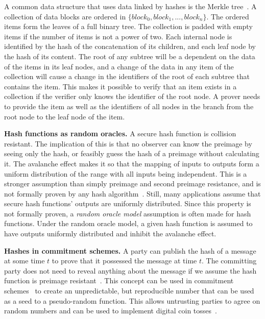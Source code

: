 A common data structure that uses data linked by hashes is the Merkle tree~\cite{merkle_digital_1988}. A collection of data blocks are ordered in $\{block_0, block_1, ..., block_n\}$. The ordered items form the leaves of a full binary tree. The collection is padded with empty items if the number of items is not a power of two. Each internal node is identified by the hash of the concatenation of its children, and each leaf node by the hash of its content. The root of any subtree will be a dependent on the data of the items in its leaf nodes, and a change of the data in any item of the collection will cause a change in the identifiers of the root of each subtree that contains the item. 
This makes it possible to verify that an item exists in a collection if the verifier only knows the identifier of the root node. A prover needs to provide the item as well as the identifiers of all nodes in the branch from the root node to the leaf node of the item. 

\noindent
{\bf Hash functions as random oracles.}
A secure hash function is collision resistant. The implication of this is that no observer can know the preimage by seeing only the hash, or feasibly guess the hash of a preimage without calculating it. The avalanche effect makes it so that the mapping of inputs to outputs form a uniform distribution of the range with all inputs being independent. This is a stronger assumption than simply preimage and second preimage resistance, and is not formally proven by any hash algorithm~\cite[p.~179-181]{lindell2014introduction}. Still, many applications assume that secure hash functions' outputs are uniformly distributed. Since this property is not formally proven, a \emph{random oracle model} assumption is often made for hash functions. Under the random oracle model, a given hash function is assumed to have outputs uniformly distributed and inhibit the avalanche effect.

\noindent
{\bf Hashes in commitment schemes.}
A party can publish the hash of a message at some time $t$ to prove that it possessed the message at time $t$. The committing party does not need to reveal anything about the message if we assume the hash function is preimage resistant~\cite[p.~187--189]{lindell2014introduction}. This concept can be used in commitment schemes~\cite{brassard1988minimum} to create an unpredictable, but reproducible number that can be used as a seed to a pseudo-random function. This allows untrusting parties to agree on random numbers and can be used to implement digital coin tosses~\cite{blum1983coin,back_note_2014}.

